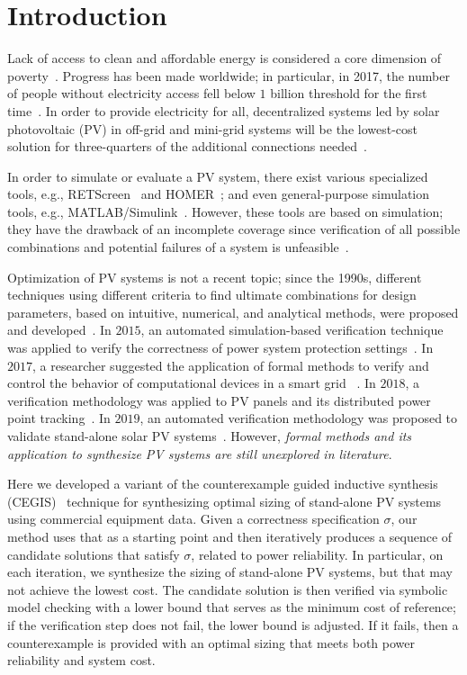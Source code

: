 \documentclass[runningheads]{llncs}
\begin{document}
\section{Introduction}

Lack of access to clean and affordable energy is considered a core dimension of poverty~\cite{Hussein2012}. Progress has been made worldwide; in particular, in 2017, the number of people without electricity access fell below $1$ billion threshold for the first time~\cite{IEAweo2018}. In order to provide electricity for all, decentralized systems led by solar photovoltaic (PV) in off-grid and mini-grid systems will be the lowest-cost solution for three-quarters of the additional connections needed~\cite{Hussein2012}. 

In order to simulate or evaluate a PV system, there exist various specialized tools, e.g., RETScreen~\cite{Pradhan} and HOMER~\cite{Swarnkar}; and even general-purpose simulation tools, e.g., MATLAB/Simulink~\cite{Gow1999}. 
 However, these tools are based on simulation; they have the drawback of an incomplete coverage since verification of all possible combinations and potential failures of a system is unfeasible~\cite{ClarkeHV18}. 

Optimization of PV systems is not a recent topic; since the 1990s, different techniques using different criteria to find ultimate combinations for design parameters, based on intuitive, numerical, and analytical methods, were proposed and developed~\cite{Alsadi2018}. In $2015$, an automated simulation-based verification technique was applied to verify the correctness of power system protection settings~\cite{Sengupta2015}. In $2017$, a researcher suggested the application of formal methods to verify and control the behavior of computational devices in a smart grid ~\cite{Abate2017}. In $2018$, a verification methodology was applied to PV panels and its distributed power point tracking~\cite{Driouich2018}. In $2019$, an automated verification methodology was proposed to validate stand-alone solar PV systems~\cite{TrindadeCordeiro19}. However, \textit{formal methods and its application to synthesize PV systems are still unexplored in literature}.

Here we developed a variant of the counterexample guided inductive synthesis (CEGIS)~\cite{DBLP:conf/asplos/Solar-LezamaTBSS06} technique for synthesizing optimal sizing of stand-alone PV systems using commercial equipment data. Given a correctness specification $\sigma$, our method uses that as a starting point and then iteratively produces a sequence of candidate solutions that satisfy $\sigma$, related to power reliability. In particular, on each iteration, we synthesize the sizing of stand-alone PV systems, but that may not achieve the lowest cost. The candidate solution is then verified via symbolic model checking with a lower bound that serves as the minimum cost of reference; if the verification step does not fail, the lower bound is adjusted. If it fails, then a counterexample is provided with an optimal sizing that meets both power reliability and system cost. 
\end{document}

